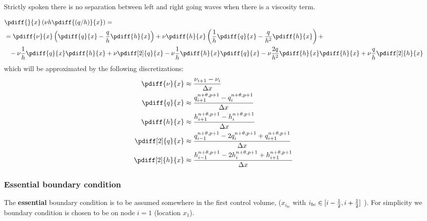 \begin{Remark}
    \item Strictly spoken there is no separation between left and right going waves when there is a viscosity term.
\end{Remark}
\begin{align}
&\pdiff{}{x}\left(\nu h \pdiff{(q/h)}{x}\right) =
\\
& = \pdiff{\nu}{x} \left(\pdiff{q}{x} - \frac{q}{h}\pdiff{h}{x}\right) +
\nu \pdiff{h}{x} \left( \frac{1}{h} \pdiff{q}{x} - \frac{q}{h^2}\pdiff{h}{x} \right) +
\nonumber \\*
& \phantom{=}
- \nu \frac{1}{h}  \pdiff{q}{x} \pdiff{h}{x} +\nu \pdiff[2]{q}{x}
-  \nu \frac{1}{h} \pdiff{h}{x}\pdiff{q}{x} -
\nu \frac{2q}{h^2} \pdiff{h}{x}\pdiff{h}{x}
+
\nu \frac{q}{h} \pdiff[2]{h}{x}
\end{align}
which will be approximated by the following discretizations:
\begin{align}
    \pdiff{\nu}{x} & \approx \frac{\nu_{i+1} - \nu_{i}}{\Dx}
    \\
    \pdiff{q}{x} & \approx \frac{q^{n+\theta,p+1}_{i+1} - q^{n+\theta, p+1}_{i}}{\Dx}
    \\
    \pdiff{h}{x} & \approx \frac{h^{n+\theta,p+1}_{i+1} - h^{n+\theta, p+1}_{i}}{\Dx}
    \\
    \pdiff[2]{q}{x} & \approx \frac{q^{n+\theta,p+1}_{i-1} - 2 q^{n+\theta, p+1}_{i} + q^{n+\theta, p+1}_{i+1}}{\Dx}
    \\
    \pdiff[2]{h}{x} & \approx \frac{h^{n+\theta,p+1}_{i-1} - 2 h^{n+\theta, p+1}_{i} + h^{n+\theta, p+1}_{i+1}}{\Dx}
\end{align}
\subsubsection{Essential boundary condition}
The \textbf{essential} boundary condition is to be assumed somewhere in the first control volume, ($x_{i_{bc}}$ with $i_{bc} \in [i-\frac{1}{2}, i+\frac{1}{2}]$ ).
For simplicity we boundary condition is chosen to be on node $i=1$ (location $x_{1}$).

